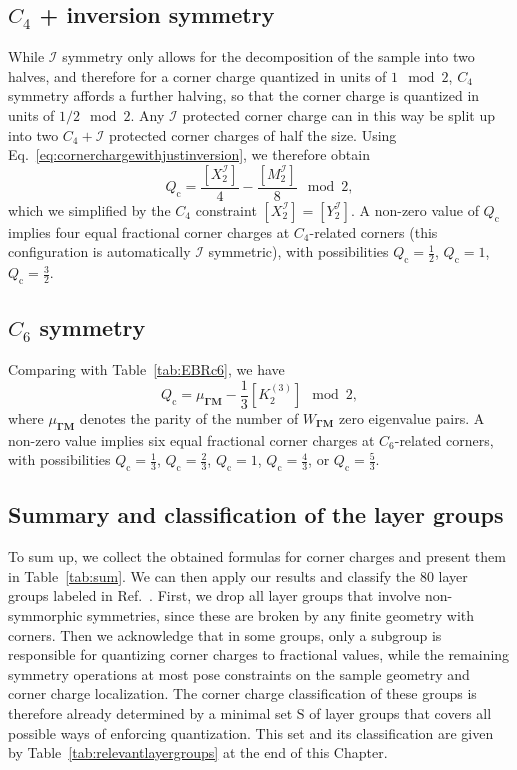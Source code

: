 \subsection{$C_4$ + inversion symmetry}
While $\mathcal{I}$ symmetry only allows for the decomposition of the sample into two halves, and therefore for a corner charge quantized in units of $1 \mod 2$, $C_4$ symmetry affords a further halving, so that the corner charge is quantized in units of $1/2 \mod 2$. Any $\mathcal{I}$ protected corner charge can in this way be split up into two $C_4 + \mathcal{I}$ protected corner charges of half the size. Using Eq.~\eqref{eq:cornerchargewithjustinversion}, we therefore obtain
\begin{equation}
Q_\mathrm{c} = \frac{[X^\mathcal{I}_2]}{4} - \frac{[M^\mathcal{I}_2]}{8} \mod 2,
\label{eq:cornerchargewithjustinversion2}
\end{equation}
which we simplified by the $C_4$ constraint $[X^\mathcal{I}_2] = [Y^\mathcal{I}_2]$.
A non-zero value of $Q_\mathrm{c}$ implies four equal fractional corner charges at $C_4$-related corners (this configuration is automatically $\mathcal{I}$ symmetric), with possibilities $Q_\mathrm{c} = \frac{1}{2}$, $Q_\mathrm{c} = 1$, $Q_\mathrm{c} = \frac{3}{2}$.

\subsection{$C_6$ symmetry}
Comparing with Table~\ref{tab:EBRc6}, we have
\begin{equation}
Q_\mathrm{c} = \mu_{\mathbf{\Gamma M}} -\frac{1}{3} [K^{(3)}_2] \mod 2,
\end{equation}
where $\mu_{\mathbf{\Gamma M}}$ denotes the parity of the number of $W_{\mathbf{\Gamma M}}$ zero eigenvalue pairs. A non-zero value implies six equal fractional corner charges at $C_6$-related corners, with possibilities $Q_\mathrm{c} = \frac{1}{3}$, $Q_\mathrm{c} = \frac{2}{3}$, $Q_\mathrm{c} = 1$, $Q_\mathrm{c} = \frac{4}{3}$, or $Q_\mathrm{c} = \frac{5}{3}$.

\subsection{Summary and classification of the layer groups}
To sum up, we collect the obtained formulas for corner charges and present them in Table~\ref{tab:sum}. We can then apply our results and classify the 80 layer groups labeled in Ref.~\cite{Aroyo2011183}. First, we drop all layer groups that involve non-symmorphic symmetries, since these are broken by any finite geometry with corners. Then we acknowledge that in some groups, only a subgroup is responsible for quantizing corner charges to fractional values, while the remaining symmetry operations at most pose constraints on the sample geometry and corner charge localization. The corner charge classification of these groups is therefore already determined by a minimal set $\mathrm{S}$ of layer groups that covers all possible ways of enforcing quantization. This set and its classification are given by Table~\ref{tab:relevantlayergroups} at the end of this Chapter.

